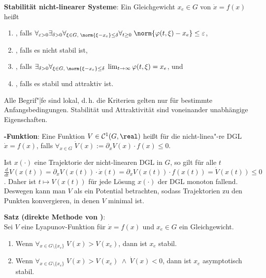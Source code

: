 \textbf{Stabilität nicht-linearer Systeme}:
Ein Gleichgewicht $x_e \in G$ von $\dot{x} = f(x)$ heißt
\begin{enumerate}
    \item
    , falls
    $\forall_{\varepsilon > 0} \exists_{\delta > 0}
    \forall_{\xi \in G,\; \norm{\xi - x_e} \le \delta} \forall_ {t \ge 0}\;
    \norm{\varphi(t, \xi) - x_e} \le \varepsilon$,

    \item
    , falls es nicht stabil ist,

    \item
    , falls
    $\exists_{\delta > 0} \forall_{\xi \in G,\; \norm{\xi - x_e} \le \delta}\;
    \lim_{t \to \infty} \varphi(t, \xi) = x_e$, und

    \item
    , falls es stabil und attraktiv ist.
\end{enumerate}

Alle Begrif"|fe sind lokal, d.\,h. die Kriterien gelten nur für bestimmte Anfangsbedingungen.
Stabilität und Attraktivität sind voneinander unabhängige Eigenschaften.

\linie

\textbf{-Funktion}:
Eine Funktion $V \in \C^1(G, \real)$ heißt
 für die nicht-linea"-re DGL $\dot{x} = f(x)$, falls
$\forall_{x \in G}\; \dot{V}(x) := \partial_x V(x) \cdot f(x) \le 0$.

Ist $x(\cdot)$ eine Trajektorie der nicht-linearen DGL in $G$, so gilt für alle $t$\\
$\frac{d}{dt} V(x(t)) = \partial_x V(x(t)) \cdot \dot{x}(t)
= \partial_x V(x(t)) \cdot f(x(t)) = \dot{V}(x(t)) \le 0$.
Daher ist $t \mapsto V(x(t))$ für jede Lösung $x(\cdot)$ der DGL monoton fallend.
Deswegen kann man $V$ als ein Potential betrachten,
sodass Trajektorien zu den Punkten konvergieren, in denen $V$ minimal ist.

\linie

\textbf{Satz (direkte Methode von )}:\\
Sei $V$ eine Lyapunov-Funktion für $\dot{x} = f(x)$ und $x_e \in G$ ein Gleichgewicht.
\begin{enumerate}
    \item
    Wenn $\forall_{x \in G \setminus \{x_e\}}\; V(x) > V(x_e)$,
    dann ist $x_e$ stabil.

    \item
    Wenn $\forall_{x \in G \setminus \{x_e\}}\; V(x) > V(x_e) \;\land\; \dot{V}(x) < 0$,
    dann ist $x_e$ asymptotisch stabil.
\end{enumerate}

